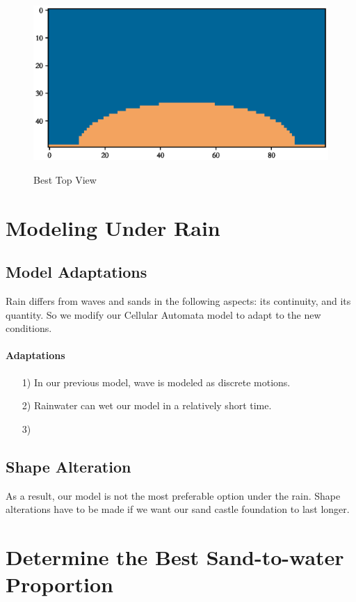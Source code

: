 \documentclass[12pt]{article}
\begin{document}
\begin{figure}[H]
    \centering
    \caption{Best Top View}
    \includegraphics[width=\linewidth]{result.eps}
    \label{fig:result}
\end{figure}

\section{Modeling Under Rain}
\subsection{Model Adaptations}
Rain differs from waves and sands in the following aspects: its continuity, and its quantity. So we modify our Cellular Automata model to adapt to the new conditions.
\paragraph{Adaptations}
\begin{itemize}
    \item [1)]
          In our previous model, wave is modeled as discrete motions.
    \item [2)]
          Rainwater can wet our model in a relatively short time.
    \item [3)]

\end{itemize}
\subsection{Shape Alteration}
As a result, our model is not the most preferable option under the rain. Shape alterations have to be made if we want our sand castle foundation to last longer.
\section{Determine the Best Sand-to-water Proportion}
\end{document}
